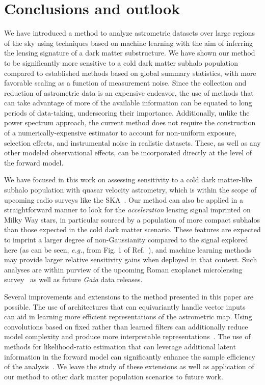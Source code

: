 \documentclass[preprint]{article}
\begin{document}
\section{Conclusions and outlook}
\label{sec:conclusions}

We have introduced a method to analyze astrometric datasets over large regions of the sky using techniques based on machine learning with the aim of inferring the lensing signature of a dark matter substructure. We have shown our method to be significantly more sensitive to a cold dark matter subhalo population compared to established methods based on global summary statistics, with more favorable scaling as a function of measurement noise. Since the collection and reduction of astrometric data is an expensive endeavor, the use of methods that can take advantage of more of the available information can be equated to long periods of data-taking, underscoring their importance. Additionally, unlike the power spectrum approach, the current method does not require the construction of a numerically-expensive estimator to account for non-uniform exposure, selection effects, and instrumental noise in realistic datasets. These, as well as any other modeled observational effects, can be incorporated directly at the level of the forward model. 

We have focused in this work on assessing sensitivity to a cold dark matter-like subhalo population with quasar velocity astrometry, which is within the scope of upcoming radio surveys like the SKA~\cite{Fomalont:2004hr,Jarvis:2015tqa}. Our method can also be applied in a straightforward manner to look for the \emph{acceleration} lensing signal imprinted on Milky Way stars, in particular sourced by a population of more compact subhalos than those expected in the cold dark matter scenario. These features are expected to imprint a larger degree of non-Gaussianity compared to the signal explored here (as can be seen, \emph{e.g.}, from Fig. 1 of Ref.~\cite{Mishra-Sharma:2020ynk}), and machine learning methods may provide larger relative sensitivity gains when deployed in that context. Such analyses are within purview of the upcoming Roman exoplanet microlensing survey~\cite{Pardo:2021uzy} as well as future \emph{Gaia} data releases.

Several improvements and extensions to the method presented in this paper are possible. The use of architectures that can equivariantly handle vector inputs~\cite{esteves2020spinweighted} can aid in learning more efficient representations of the astrometric map. Using convolutions based on fixed rather than learned filters can additionally reduce model complexity and produce more interpretable representations~\cite{Cheng:2020qbx,2021arXiv210709145H,2021arXiv210411244S,2021arXiv210202828M,Valogiannis:2021chp}. The use of methods for likelihood-ratio estimation that can leverage additional latent information in the forward model can significantly enhance the sample efficiency of the analysis~\cite{Brehmer:2018eca,Brehmer:2018hga,Brehmer:2018kdj,Stoye:2018ovl}. We leave the study of these extensions as well as application of our method to other dark matter population scenarios to future work.
\end{document}
